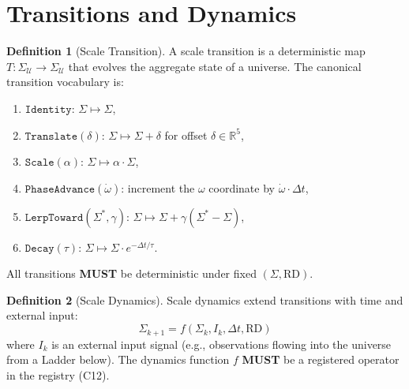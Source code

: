 \documentclass[11pt,a4paper,twoside]{article}
\theoremstyle{definition}
\newtheorem{definition}{Definition}[section]
\theoremstyle{plain}
\theoremstyle{remark}
\newcommand{\RR}{\mathbb{R}}
\newcommand{\calU}{\mathcal{U}}
\begin{document}
\section{Transitions and Dynamics}\label{sec:transitions}

\begin{definition}[Scale Transition]\label{def:transition}
A scale transition is a deterministic map
$T: \Sigma_\calU \to \Sigma_\calU$
that evolves the aggregate state of a universe. The canonical
transition vocabulary is:
\begin{enumerate}[nosep,label=(\roman*)]
  \item $\mathtt{Identity}$: $\Sigma \mapsto \Sigma$,
  \item $\mathtt{Translate}(\delta)$: $\Sigma \mapsto \Sigma + \delta$
        for offset $\delta \in \RR^5$,
  \item $\mathtt{Scale}(\alpha)$: $\Sigma \mapsto \alpha \cdot \Sigma$,
  \item $\mathtt{PhaseAdvance}(\dot\omega)$: increment the $\omega$
        coordinate by $\dot\omega \cdot \Delta t$,
  \item $\mathtt{LerpToward}(\Sigma^*, \gamma)$:
        $\Sigma \mapsto \Sigma + \gamma(\Sigma^* - \Sigma)$,
  \item $\mathtt{Decay}(\tau)$:
        $\Sigma \mapsto \Sigma \cdot e^{-\Delta t / \tau}$.
\end{enumerate}
All transitions \textbf{MUST} be deterministic under fixed
$(\Sigma, \mathrm{RD})$.
\end{definition}

\begin{definition}[Scale Dynamics]\label{def:dynamics}
Scale dynamics extend transitions with time and external input:
\[
  \Sigma_{k+1} = f(\Sigma_k, I_k, \Delta t, \mathrm{RD})
\]
where $I_k$ is an external input signal (e.g., observations flowing into
the universe from a Ladder below). The dynamics function $f$
\textbf{MUST} be a registered operator in the registry (C12).
\end{definition}
\end{document}
